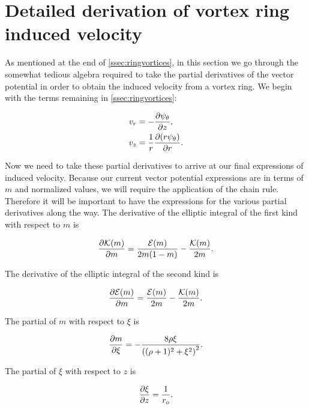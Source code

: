 \section{Detailed derivation of vortex ring induced velocity}
\label{app:ringvortexinducedvelocities}

As mentioned at the end of \cref{ssec:ringvortices}, in this section we go through the somewhat tedious algebra required to take the partial derivatives of the vector potential in order to obtain the induced velocity from a vortex ring.
%
We begin with the terms remaining in \cref{ssec:ringvortices}:

\begin{align}
    v_r &= -\frac{\partial \psi_\theta}{\partial z}, \\
    v_z &= \frac{1}{r}\frac{\partial (r\psi_\theta)}{\partial r}.
\end{align}

Now we need to take these partial derivatives to arrive at our final expressions of induced velocity.
%
Because our current vector potential expressions are in terms of \(m\) and normalized values, we will require the application of the chain rule.
%
Therefore it will be important to have the expressions for the various partial derivatives along the way.
%
The derivative of the elliptic integral of the first kind with respect to \(m\) is

\begin{equation}
    \label{eqn:dkdm}
    \frac{\partial \mathcal{K}(m)}{\partial m} = \frac{\mathcal{E}(m)}{2m(1-m)} - \frac{\mathcal{K}(m)}{2m}.
\end{equation}

\noindent The derivative of the elliptic integral of the second kind is

\begin{equation}
    \label{eqn:dkdm2}
    \frac{\partial \mathcal{E}(m)}{\partial m} = \frac{\mathcal{E}(m)}{2m} - \frac{\mathcal{K}(m)}{2m}.
\end{equation}

\noindent The partial of \(m\) with respect to \(\xi\) is

\begin{equation}
    \frac{\partial m}{\partial \xi} = - \frac{8 \rho \xi }{\left((\rho+1)^2+\xi^2\right)^2}.
\end{equation}

\noindent The partial of \(\xi\) with respect to \(z\) is

\begin{equation}
    \frac{\partial \xi}{\partial z} = \frac{1}{r_o}.
\end{equation}


